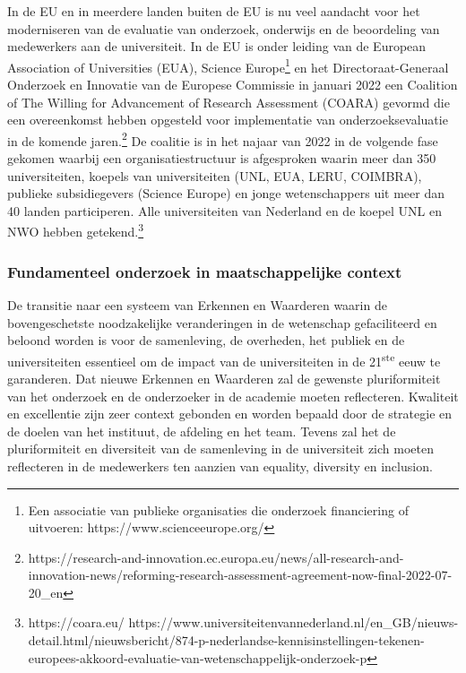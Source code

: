 \documentclass[empirical, authordate, ]{new-jote-article}
\begin{document}
	In de EU en in meerdere landen buiten de EU is nu veel aandacht voor het moderniseren van de evaluatie van onderzoek, onderwijs en de beoordeling van medewerkers aan de universiteit. In de EU is onder leiding van de European Association of Universities (EUA), Science Europe\footnote{Een associatie van publieke organisaties die onderzoek financiering of uitvoeren: https://www.scienceeurope.org/} en het Directoraat-Generaal Onderzoek en Innovatie van de Europese Commissie in januari 2022 een Coalition of The Willing for Advancement of Research Assessment (COARA) gevormd die een overeenkomst hebben opgesteld voor implementatie van onderzoeksevaluatie in de komende jaren.\footnote{https://research-and-innovation.ec.europa.eu/news/all-research-and-innovation-news/reforming-research-assessment-agreement-now-final-2022-07-20\_en} De coalitie is in het najaar van 2022 in de volgende fase gekomen waarbij een organisatiestructuur is afgesproken waarin meer dan 350 universiteiten, koepels van universiteiten (UNL, EUA, LERU, COIMBRA), publieke subsidiegevers (Science Europe) en jonge wetenschappers uit meer dan 40 landen participeren. Alle universiteiten van Nederland en de koepel UNL en NWO hebben getekend.\footnote{https://coara.eu/ https://www.universiteitenvannederland.nl/en\_GB/nieuws-detail.html/nieuwsbericht/874-p-nederlandse-kennisinstellingen-tekenen-europees-akkoord-evaluatie-van-wetenschappelijk-onderzoek-p}



	\subsubsection{Fundamenteel onderzoek in maatschappelijke context}



	De transitie naar een systeem van Erkennen en Waarderen waarin de bovengeschetste noodzakelijke veranderingen in de wetenschap gefaciliteerd en beloond worden is voor de samenleving, de overheden, het publiek en de universiteiten essentieel om de impact van de universiteiten in de 21\textsuperscript{ste} eeuw te garanderen. Dat nieuwe Erkennen en Waarderen zal de gewenste pluriformiteit van het onderzoek en de onderzoeker in de academie moeten reflecteren. Kwaliteit en excellentie zijn zeer context gebonden en worden bepaald door de strategie en de doelen van het instituut, de afdeling en het team. Tevens zal het de pluriformiteit en diversiteit van de samenleving in de universiteit zich moeten reflecteren in de medewerkers ten aanzien van equality, diversity en inclusion.
\end{document}
